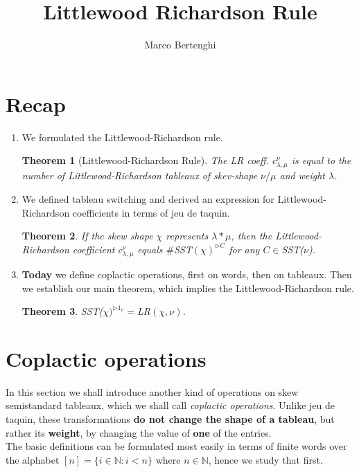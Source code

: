 \documentclass{article}
\title{Littlewood Richardson Rule}
\author{Marco Bertenghi}
\date{}
\newtheorem{thm}{Theorem}
\begin{document}
\maketitle
\section{Recap}
\begin{enumerate}
    \item We formulated the Littlewood-Richardson rule.
    \begin{thm}[Littlewood-Richardson Rule] The LR coeff. $c_{\lambda, \mu}^\nu$ is equal to the number of Littlewood-Richardson tableaux of skev-shape $\nu/\mu$ and weight $\lambda$.
    \end{thm}
    \item We defined tableau switching and derived an expression for Littlewood-Richardson coefficients in terms of jeu de taquin.
    \begin{thm} If the skew shape $\chi$ represents $\lambda* \mu$, then the Littlewood-Richardson coefficient $c_{ \lambda, \mu}^\nu$ equals $\#$SST$( \chi)^{\triangleright C}$ for any $C \in $SST($\nu$).  
    \end{thm}
    \item \textbf{Today} we define coplactic operations, first on words, then on tableaux. Then we establish our main theorem, which implies the Littlewood-Richardson rule. 
    \begin{thm} SST($\chi)^{ \triangleright 1_\nu} = $LR$( \chi, \nu)$. 
    \end{thm}
\end{enumerate}
\section{Coplactic operations}
In this section we shall introduce another kind of operations on skew semistandard
tableaux, which we shall call \textit{coplactic operations}. Unlike jeu de taquin, these
transformations \textbf{do not change the shape of a tableau}, but rather its \textbf{weight}, by
changing the value of \textbf{one} of the entries.
\\
The basic definitions can be formulated
most easily in terms of finite words over the alphabet $[n]= \{i \in \mathbb{N}: i < n\}$ where $n \in \mathbb{N}$,  hence we study that first. 
\end{document}
